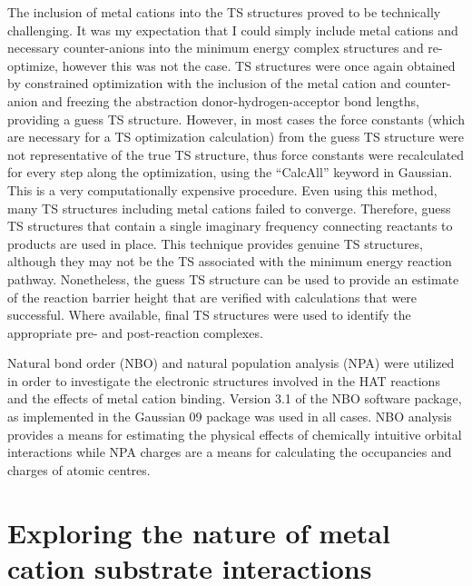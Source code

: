 \begin{doublespace}
The inclusion of metal cations into the TS structures proved to be technically
challenging. It was my expectation that I could simply include metal cations and
necessary counter-anions into the minimum energy complex structures and
re-optimize, however this was not the case. TS structures were once again
obtained by constrained optimization with the inclusion of the metal cation and
counter-anion and freezing the abstraction donor-hydrogen-acceptor bond lengths,
providing a guess TS structure. However, in most cases the force constants
(which are necessary for a TS optimization calculation) from the guess TS
structure were not representative of the true TS structure, thus force constants
were recalculated for every step along the optimization, using the ``CalcAll''
keyword in Gaussian. This is a very computationally expensive procedure. Even
using this method, many TS structures including metal cations failed to
converge. Therefore, guess TS structures that contain a single imaginary
frequency connecting reactants to products are used in place. This technique
provides genuine TS structures, although they may not be the TS associated with
the minimum energy reaction pathway. Nonetheless, the guess TS structure can be
used to provide an estimate of the reaction barrier height that are verified
with calculations that were successful. Where available, final TS structures
were used to identify the appropriate pre- and post-reaction complexes.

Natural bond order (NBO) and natural population analysis (NPA) were utilized in
order to investigate the electronic structures involved in the HAT reactions and
the effects of metal cation binding.\cite{Reed1983, Reed1985, Glendening2012}
Version 3.1 of the NBO software package,\cite{NBO3} as implemented in the
Gaussian 09 package was used in all cases.\cite{Frisch2009} NBO analysis
provides a means for estimating the physical effects of chemically intuitive
orbital interactions while NPA charges are a means for calculating the
occupancies and charges of atomic centres.\cite{Landis2014, Weinhold2016}

\section{Exploring the nature of metal cation substrate interactions}


\end{doublespace}
